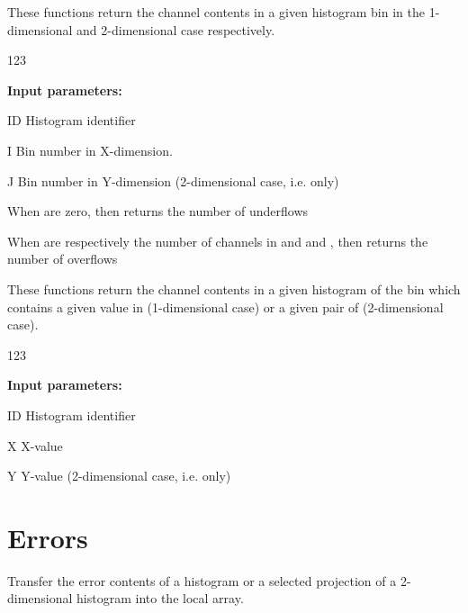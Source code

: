  
\Action
These functions return the channel contents in a given histogram bin
in the 1-dimensional and 2-dimensional case respectively.
 
\begin{DLtt}{123}
\item[{\rm\bf Input parameters:}]
\item[ID] Histogram identifier
\item[I] Bin number in X-dimension.
\item[J] Bin number in Y-dimension (2-dimensional case, i.e.  only)
\end{DLtt}
 
\begin{UL}
\item When  are zero, then  returns the number of underflows
\item When
 are respectively the number of channels in  and
 and
, then  returns the number of overflows
\end{UL}
 
 
\Action
These functions return the channel contents in a given histogram of the bin
which contains a given value in  (1-dimensional case) or
a given pair of  (2-dimensional case).
 
\begin{DLtt}{123}
\item[{\rm\bf Input parameters:}]
\item[ID] Histogram identifier
\item[X] X-value
\item[Y] Y-value (2-dimensional case, i.e.  only)
\end{DLtt}

\newpage
 
\section{Errors}
\label{HERRORS} 

 
\Action
Transfer the error contents of a histogram or a selected projection of
a 2-dimensional histogram into the local array.
 
